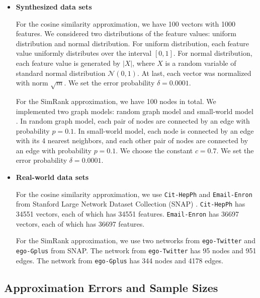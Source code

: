 \documentclass{article}
\begin{document}
\begin{itemize}
\item \textbf{Synthesized data sets}

For the cosine similarity approximation, we have 100 vectors with 1000 features. We considered two distributions of the feature values: uniform distribution and normal distribution. For uniform distribution, each feature value uniformly distributes over the interval $[0,1]$. For normal distribution, each feature value is generated by $|X|$, where $X$ is a random variable of standard normal distribution $\mathcal{N}(0,1)$. At last, each vector was normalized with norm $\sqrt{m}$. We set the error probability $\delta = 0.0001$.

For the SimRank approximation, we have 100 nodes in total. We implemented two graph models: random graph model \cite{Gil59} and small-world model \cite{WS98}. In random graph model, each pair of nodes are connected by an edge with probability $p=0.1$. In small-world model, each node is connected by an edge with its 4 nearest neighbors, and each other pair of nodes are connected by an edge with probability $p=0.1$. We choose the constant $c=0.7$. We set the error probability $\delta = 0.0001$.

\item \textbf{Real-world data sets}

For the cosine similarity approximation, we use \texttt{Cit-HepPh} and \texttt{Email-Enron} from Stanford Large Network Dataset Collection (SNAP) \cite{LK15}. \texttt{Cit-HepPh} has 34551 vectors, each of which has 34551 features. \texttt{Email-Enron} has 36697 vectors, each of which has 36697 features.

For the SimRank approximation, we use two networks from \texttt{ego-Twitter} and \texttt{ego-Gplus} from SNAP. The network from \texttt{ego-Twitter} has 95 nodes and 951 edges. The network from \texttt{ego-Gplus} has 344 nodes and 4178 edges.
\end{itemize}

\subsection{Approximation Errors and Sample Sizes}
\end{document}

